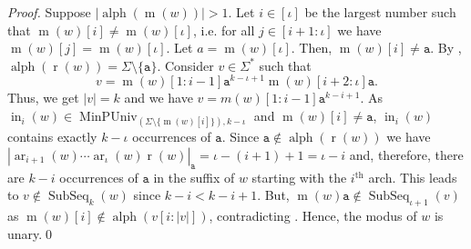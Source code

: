 \documentclass[runningheads,UKenglish,cleveref, autoref, thm-restate]{llncs}
\def\ta{\mathtt{a}}
\def\r{\operatorname{r}}
\def\m{\operatorname{m}}
\DeclareMathOperator{\ar}{ar}
\DeclareMathOperator{\alphabet}{alph}
\DeclareMathOperator\ScatFact{SubSeq}
\DeclareMathOperator{\MinPerfUniv}{MinPUniv}
\DeclareMathOperator{\inner}{in}
\def\nth#1{#1$^{\text{th}}$}
\begin{document}
\begin{proof}
	Suppose $\vert \alphabet(\m(w))\vert  > 1$.
	Let $i\in[\iota]$ be the largest number such that $\m(w)[i] \neq \m(w)[\iota]$, i.e.
	for all $j\in[i+1:\iota]$ we have $\m(w)[j] = \m(w)[\iota]$.
	Let $a=\m(w)[\iota]$. Then, $\m(w)[i] \neq \ta$.
	By , $\alphabet(\r(w)) = \Sigma\setminus\{\ta\}$.
	Consider $v\in\Sigma^*$ such that 
	\[
	v = \m(w)[1:i-1]\ta^{k-\iota+1}\m(w)[i+2:\iota]\ta.
	\]
	Thus, we get $\vert v\vert  = k$ and we have 
	$v = m(w)[1:i-1]\ta^{k-i+1}$.
	As $\inner_i(w) \in \MinPerfUniv_{(\Sigma\setminus\{\m(w)[i]\}),k-\iota}$ and $\m(w)[i]\neq \ta$, $\inner_i(w)$ contains exactly 
	$k-\iota$ occurrences of $\ta$. 
	Since $\ta\notin\alphabet(\r(w))$ we have $|\ar_{i+1}(w)\cdots\ar_{\iota}(w)\r(w)|_{\ta}=
	\iota-(i+1)+1=\iota-i$ and, therefore, there are $k-i$ occurrences of $\ta$ in the suffix of $w$ starting with the \nth{$i$} arch. This leads to $v\not\in\ScatFact_k(w)$ since $k-i<k-i+1$.
	But, $\m(w)\ta \notin \ScatFact_{\iota+1}(v)$ as $\m(w)[i] \notin \alphabet(v[i:\vert v\vert ])$, contradicting .
	Hence, the modus of $w$ is unary.\qed
\end{proof}

\fi


\end{document}
